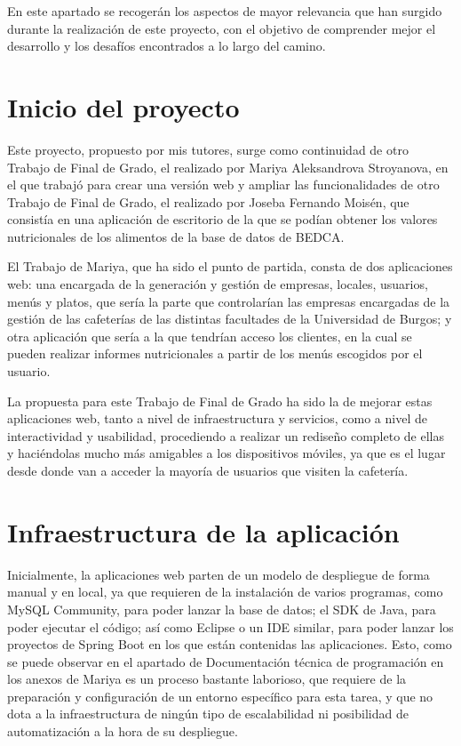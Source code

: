 
En este apartado se recogerán los aspectos de mayor relevancia que han surgido durante la realización de este proyecto, con el objetivo de comprender mejor el desarrollo y los desafíos encontrados a lo largo del camino.

\section{Inicio del proyecto}

Este proyecto, propuesto por mis tutores, surge como continuidad de otro Trabajo de Final de Grado, el realizado por Mariya Aleksandrova Stroyanova, en el que trabajó para crear una versión web y ampliar las funcionalidades de otro Trabajo de Final de Grado, el realizado por Joseba Fernando Moisén, que consistía en una aplicación de escritorio de la que se podían obtener los valores nutricionales de los alimentos de la base de datos de BEDCA. 

El Trabajo de Mariya, que ha sido el punto de partida, consta de dos aplicaciones web: una encargada de la generación y gestión de empresas, locales, usuarios, menús y platos, que sería la parte que controlarían las empresas encargadas de la gestión de las cafeterías de las distintas facultades de la Universidad de Burgos; y otra aplicación que sería a la que tendrían acceso los clientes, en la cual se pueden realizar informes nutricionales a partir de los menús escogidos por el usuario.

La propuesta para este Trabajo de Final de Grado ha sido la de mejorar estas aplicaciones web, tanto a nivel de infraestructura y servicios, como a nivel de interactividad y usabilidad, procediendo a realizar un rediseño completo de ellas y haciéndolas mucho más amigables a los dispositivos móviles, ya que es el lugar desde donde van a acceder la mayoría de usuarios que visiten la cafetería.

\section{Infraestructura de la aplicación}

Inicialmente, la aplicaciones web parten de un modelo de despliegue de forma manual y en local, ya que requieren de la instalación de varios programas, como MySQL Community, para poder lanzar la base de datos; el SDK de Java, para poder ejecutar el código; así como Eclipse o un IDE similar, para poder lanzar los proyectos de Spring Boot en los que están contenidas las aplicaciones. Esto, como se puede observar en el apartado de Documentación técnica de programación en los anexos de Mariya \cite{tfg-mariya:anexos} es un proceso bastante laborioso, que requiere de la preparación y configuración de un entorno específico para esta tarea, y que no dota a la infraestructura de ningún tipo de escalabilidad ni posibilidad de automatización a la hora de su despliegue.

